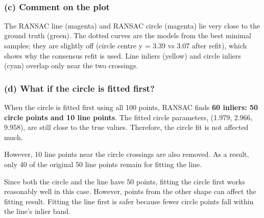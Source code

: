 \documentclass[11pt]{article}
\begin{document}
    \begin{center}
    \end{center}
    { \hspace*{\fill} \\}
    
    \subsubsection{(c) Comment on the plot}\label{c-comment-on-the-plot}

The RANSAC line (magenta) and RANSAC circle (magenta) lie very close to
the ground truth (green). The dotted curves are the models from the best
minimal samples; they are slightly off (circle centre y = 3.39 vs 3.07
after refit), which shows why the consensus refit is used. Line inliers
(yellow) and circle inliers (cyan) overlap only near the two crossings.

    \subsubsection{(d) What if the circle is fitted
first?}\label{d-what-if-the-circle-is-fitted-first}

When the circle is fitted first using all 100 points, RANSAC finds
\textbf{60 inliers: 50 circle points and 10 line points}. The fitted
circle parameters, (1.979, 2.966, 9.958), are still close to the true
values. Therefore, the circle fit is not affected much.

However, 10 line points near the circle crossings are also removed. As a
result, only 40 of the original 50 line points remain for fitting the
line.

Since both the circle and the line have 50 points, fitting the circle
first works reasonably well in this case. However, points from the other
shape can affect the fitting result. Fitting the line first is safer
because fewer circle points fall within the line's inlier band.
\end{document}
